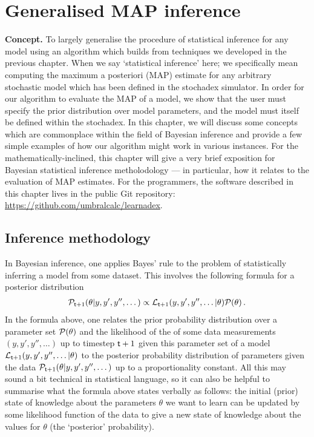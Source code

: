 \chapter{\sffamily Generalised MAP inference}

{\bfseries\sffamily Concept.} To largely generalise the procedure of statistical inference for any model using an algorithm which builds from techniques we developed in the previous chapter. When we say `statistical inference' here; we specifically mean computing the maximum a posteriori (MAP) estimate for any arbitrary stochastic model which has been defined in the stochadex simulator. In order for our algorithm to evaluate the MAP of a model, we show that the user must specify the prior distribution over model parameters, and the model must itself be defined within the stochadex. In this chapter, we will discuss some concepts which are commonplace within the field of Bayesian inference and provide a few simple examples of how our algorithm might work in various instances. For the mathematically-inclined, this chapter will give a very brief exposition for Bayesian statistical inference metholodology --- in particular, how it relates to the evaluation of MAP estimates. For the programmers, the software described in this chapter lives in the public Git repository: \href{https://github.com/umbralcalc/learnadex}{https://github.com/umbralcalc/learnadex}.


\section{\sffamily Inference methodology}

In Bayesian inference, one applies Bayes' rule to the problem of statistically inferring a model from some dataset. This involves the following formula for a posterior distribution
\begin{align}
{\cal P}_{{\sf t}+1}(\theta \vert y, y', y'', \dots) \propto {\cal L}_{{\sf t}+1}(y, y', y'', \dots\vert \theta ){\cal P} (\theta ) \label{eq:bayes-rule} \,.
\end{align}
In the formula above, one relates the prior probability distribution over a parameter set ${\cal P} (\theta )$ and the likelihood of the of some data measurements $(y, y', y'', \dots)$  up to timestep ${\sf t}+1$ given this parameter set of a model ${\cal L}_{{\sf t}+1}(y, y', y'', \dots \vert \theta )$ to the posterior probability distribution of parameters given the data ${\cal P}_{{\sf t}+1}(\theta \vert y, y', y'', \dots)$ up to a proportionality constant. All this may sound a bit technical in statistical language, so it can also be helpful to summarise what the formula above states verbally as follows: the initial (prior) state of knowledge about the parameters $\theta$ we want to learn can be updated by some likelihood function of the data to give a new state of knowledge about the values for $\theta$ (the `posterior' probability). 

